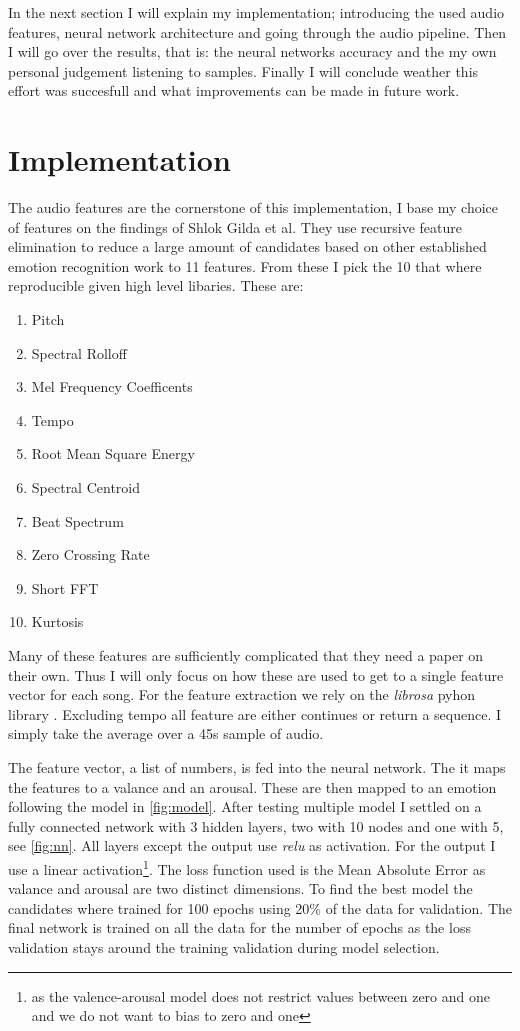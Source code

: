 \documentclass[lang=en, hanging-titles=true]{skrapport}
\begin{document}
In the next section I will explain my implementation; introducing the used audio features, neural network architecture and going through the audio pipeline. Then I will go over the results, that is: the neural networks accuracy and the my own personal judgement listening to samples. Finally I will conclude weather this effort was succesfull and what improvements can be made in future work.

\section{Implementation}
The audio features are the cornerstone of this implementation, I base my choice of features on the findings of Shlok Gilda et al\cite{features}. They use recursive feature elimination to reduce a large amount of candidates based on other established emotion recognition work to 11 features. From these I pick the 10 that where reproducible given high level libaries. These are:

\begin{multicols}{2}
\begin{enumerate}
	\item Pitch
	\item Spectral Rolloff
	\item Mel Frequency Coefficents
	\item Tempo
	\item Root Mean Square Energy
	\item Spectral Centroid
	\item Beat Spectrum
	\item Zero Crossing Rate
	\item Short FFT
	\item Kurtosis
\end{enumerate}
\end{multicols}

Many of these features are sufficiently complicated that they need a paper on their own. Thus I will only focus on how these are used to get to a single feature vector for each song. For the feature extraction we rely on the \textit{librosa} pyhon library \cite{librosa}. Excluding tempo all feature are either continues or return a sequence. I simply take the average over a 45s sample of audio. 

The feature vector, a list of numbers, is fed into the neural network. The it maps the features to a valance and an arousal. These are then mapped to an emotion following the model in \cref{fig:model}. After testing multiple model I settled on a fully connected network with 3 hidden layers, two with 10 nodes and one with 5, see \cref{fig:nn}. All layers except the output use \textit{relu} as activation. For the output I use a linear activation\footnote{as the valence-arousal model does not restrict values between zero and one and we do not want to bias to zero and one}. The loss function used is the Mean Absolute Error as valance and arousal are two distinct dimensions. To find the best model the candidates where trained for 100 epochs using 20\% of the data for validation. The final network is trained on all the data for the number of epochs as the loss validation stays around the training validation during model selection.
\end{document}

